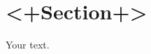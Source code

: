 \documentclass[../main.tex]{subfiles} %
\begin{document}
\section{<+Section+>}
Your text.
\end{document}

